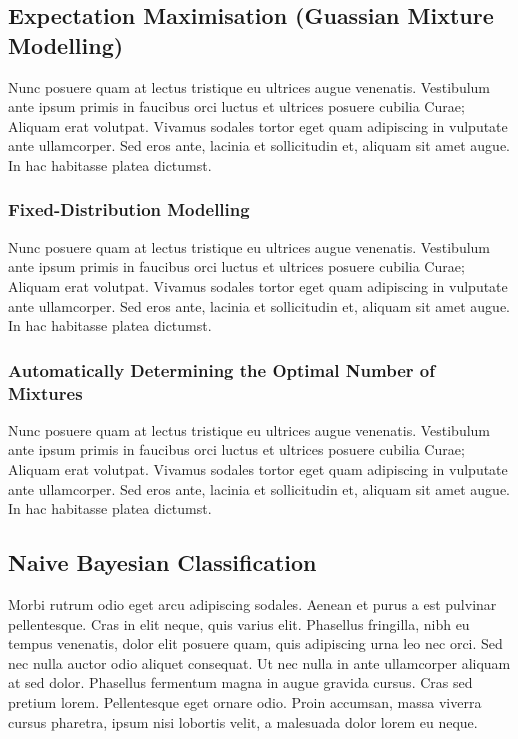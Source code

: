 \subsection{Expectation Maximisation (Guassian Mixture Modelling)}

Nunc posuere quam at lectus tristique eu ultrices augue venenatis. Vestibulum ante ipsum primis in faucibus orci luctus et ultrices posuere cubilia Curae; Aliquam erat volutpat. Vivamus sodales tortor eget quam adipiscing in vulputate ante ullamcorper. Sed eros ante, lacinia et sollicitudin et, aliquam sit amet augue. In hac habitasse platea dictumst.

\subsubsection{Fixed-Distribution Modelling}

Nunc posuere quam at lectus tristique eu ultrices augue venenatis. Vestibulum ante ipsum primis in faucibus orci luctus et ultrices posuere cubilia Curae; Aliquam erat volutpat. Vivamus sodales tortor eget quam adipiscing in vulputate ante ullamcorper. Sed eros ante, lacinia et sollicitudin et, aliquam sit amet augue. In hac habitasse platea dictumst.

\subsubsection{Automatically Determining the Optimal Number of Mixtures}

Nunc posuere quam at lectus tristique eu ultrices augue venenatis. Vestibulum ante ipsum primis in faucibus orci luctus et ultrices posuere cubilia Curae; Aliquam erat volutpat. Vivamus sodales tortor eget quam adipiscing in vulputate ante ullamcorper. Sed eros ante, lacinia et sollicitudin et, aliquam sit amet augue. In hac habitasse platea dictumst.


\subsection{Naive Bayesian Classification}
Morbi rutrum odio eget arcu adipiscing sodales. Aenean et purus a est pulvinar pellentesque. Cras in elit neque, quis varius elit. Phasellus fringilla, nibh eu tempus venenatis, dolor elit posuere quam, quis adipiscing urna leo nec orci. Sed nec nulla auctor odio aliquet consequat. Ut nec nulla in ante ullamcorper aliquam at sed dolor. Phasellus fermentum magna in augue gravida cursus. Cras sed pretium lorem. Pellentesque eget ornare odio. Proin accumsan, massa viverra cursus pharetra, ipsum nisi lobortis velit, a malesuada dolor lorem eu neque.

